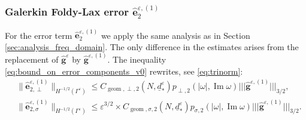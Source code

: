 \documentclass[]{article}
\numberwithin{equation}{section}
\numberwithin{theorem}{section}
\numberwithin{lemma}{section}
\numberwithin{corollary}{section}
\numberwithin{proposition}{section}
\numberwithin{definition}{section}
\newcommand{\re}{\varepsilon}
\renewcommand{\vec}{\boldsymbol}
\renewcommand{\Im}{\operatorname{Im}}
\newcommand{\trinorm}[1]{\vert\!\vert\!\vert #1 \vert\!\vert\!\vert}
\begin{document}
	\subsubsection{Galerkin Foldy-Lax error $\hat{\vec{e}}_2^{\re, (1)}$}
	\label{sec:ere2}
	For the error term $\hat{\vec{e}}_2^{\re, (1)}$ we apply the same analysis as in Section \ref{sec:analysis_freq_domain}. The only difference in the estimates arises from the replacement of $\hat{\vec{g}}^{\re}$ by $\hat{\vec{g}}^{\re, (1)}$. The inequality \eqref{eq:bound_on_error_components_v0} rewrites, see \eqref{eq:trinorm}: 
	\begin{align*}%
		&\| \hat{\boldsymbol{e}}_{2, \perp}^{\re,(1)}\|_{H^{-1/2}(\Gamma^{\re})}\leq C_{\operatorname{geom},\perp,2}(N, \underline{d}_*^{\re})p_{\perp,2}(|\omega|,\Im \omega) \trinorm{\hat{\vec{g}}^{\re,(1)}}_{3/2},\\
		&\| \hat{\boldsymbol{e}}_{2, \sigma}^{\re,(1)}\|_{H^{-1/2}(\Gamma^{\re})}\leq \varepsilon^{3/2}\times	
		C_{\operatorname{geom},\sigma,2}(N, \underline{d}_*^{\re})p_{\sigma,2}(|\omega|,\Im \omega) \trinorm{\hat{\vec{g}}^{\re,(1)}}_{3/2}.
	\end{align*}
\end{document}
